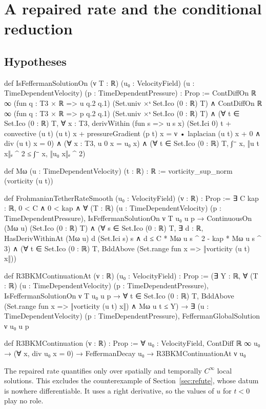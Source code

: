 \documentclass[11pt,a4paper]{article}
\theoremstyle{definition}
\theoremstyle{remark}
\begin{document}
\section{A repaired rate and the conditional reduction}\label{sec:reduction}

\subsection{Hypotheses}
\begin{leancode}
def IsFeffermanSolutionOn (ν T : ℝ) (u₀ : VelocityField)
    (u : TimeDependentVelocity) (p : TimeDependentPressure) : Prop :=
  ContDiffOn ℝ ∞ (fun q : T3 × ℝ => u q.2 q.1) (Set.univ ×ˢ Set.Ico (0 : ℝ) T) ∧
  ContDiffOn ℝ ∞ (fun q : T3 × ℝ => p q.2 q.1) (Set.univ ×ˢ Set.Ico (0 : ℝ) T) ∧
  (∀ t ∈ Set.Ico (0 : ℝ) T, ∀ x : T3,
    derivWithin (fun s => u s x) (Set.Ici 0) t + convective (u t) (u t) x +
        pressureGradient (p t) x = ν • laplacian (u t) x + 0 ∧
      div (u t) x = 0) ∧
  (∀ x : T3, u 0 x = u₀ x) ∧
  (∀ t ∈ Set.Ico (0 : ℝ) T, ∫⁻ x, ‖u t x‖ₑ ^ 2 ≤ ∫⁻ x, ‖u₀ x‖ₑ ^ 2)

def Mω (u : TimeDependentVelocity) (t : ℝ) : ℝ :=
  vorticity_sup_norm (vorticity (u t))

def FrohmanianTetherRateSmooth (u₀ : VelocityField) (ν : ℝ) : Prop :=
  ∃ C kap : ℝ, 0 < C ∧ 0 < kap ∧
    ∀ (T : ℝ) (u : TimeDependentVelocity) (p : TimeDependentPressure),
      IsFeffermanSolutionOn ν T u₀ u p →
        ContinuousOn (Mω u) (Set.Ico (0 : ℝ) T) ∧
        (∀ s ∈ Set.Ico (0 : ℝ) T, ∃ d : ℝ,
          HasDerivWithinAt (Mω u) d (Set.Ici s) s ∧
            d ≤ C * Mω u s ^ 2 - kap * Mω u s ^ 3) ∧
        (∀ t ∈ Set.Ico (0 : ℝ) T, BddAbove (Set.range fun x => ‖vorticity (u t) x‖))

def R3BKMContinuationAt (ν : ℝ) (u₀ : VelocityField) : Prop :=
  (∃ Y : ℝ, ∀ (T : ℝ) (u : TimeDependentVelocity) (p : TimeDependentPressure),
      IsFeffermanSolutionOn ν T u₀ u p → ∀ t ∈ Set.Ico (0 : ℝ) T,
        BddAbove (Set.range fun x => ‖vorticity (u t) x‖) ∧ Mω u t ≤ Y) →
    ∃ (u : TimeDependentVelocity) (p : TimeDependentPressure),
      FeffermanGlobalSolution ν u₀ u p

def R3BKMContinuation (ν : ℝ) : Prop :=
  ∀ u₀ : VelocityField, ContDiff ℝ ∞ u₀ → (∀ x, div u₀ x = 0) → FeffermanDecay u₀ →
    R3BKMContinuationAt ν u₀
\end{leancode}

\noindent The repaired rate quantifies only over spatially and temporally $C^\infty$ local solutions. This excludes the counterexample of Section~\ref{sec:refute}, whose datum is nowhere differentiable. It uses a right derivative, so the values of $u$ for $t<0$ play no role.
\end{document}
